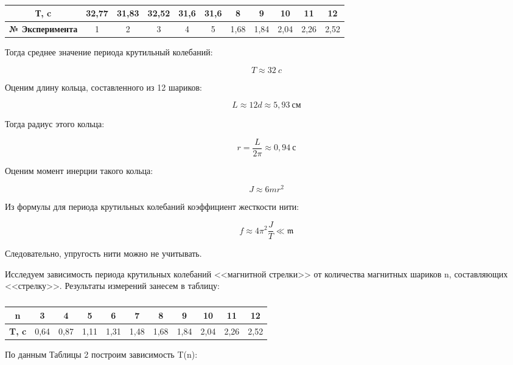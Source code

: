 \documentclass[a4paper,12pt]{article}
\begin{document}
\begin{table}[h]
\caption{}
\begin{tabular}{|c|c|c|c|c|c|c|c|c|c|c|}
\hline
\textbf{Т, c}           & 32,77 & 31,83 & 32,52 & 31,6 & 31,6 & 8    & 9    & 10   & 11   & 12   \\ \hline
\textbf{№ Эксперимента} & 1     & 2     & 3     & 4    & 5    & 1,68 & 1,84 & 2,04 & 2,26 & 2,52 \\ \hline
\end{tabular}
\end{table}

Тогда среднее значение периода крутильный колебаний:

$$
	T \approx 32 \ c
$$

Оценим длину кольца, составленного из 12 шариков:

$$
	L \approx 12d \approx 5,93 \ см
$$

Тогда радиус этого кольца:

$$
	r = \frac{L}{2\pi} \approx 0,94 \ с
$$

Оценим момент инерции такого кольца:

$$
	J \approx 6mr^2
$$

Из формулы для периода крутильных колебаний коэффициент жесткости нити:

$$
	f \approx 4 \pi^2 \frac{J}{T} \ll \mathfrak{m} 
$$

Следовательно, упругость нити можно не учитывать.

Исследуем зависимость периода крутильных колебаний <<магнитной стрелки>> от количества магнитных шариков n, составляющих <<стрелку>>. Результаты измерений занесем в таблицу:
\begin{table}[h]
\caption{}
\begin{center}
\begin{tabular}{|c|c|c|c|c|c|c|c|c|c|c|}
\hline
\textbf{n}    & 3    & 4    & 5    & 6    & 7    & 8    & 9    & 10   & 11   & 12   \\ \hline
\textbf{T, c} & 0,64 & 0,87 & 1,11 & 1,31 & 1,48 & 1,68 & 1,84 & 2,04 & 2,26 & 2,52 \\ \hline
\end{tabular}
\end{center}
\end{table}

\newpage 

По данным Таблицы 2 построим зависимость T(n):
\end{document}
